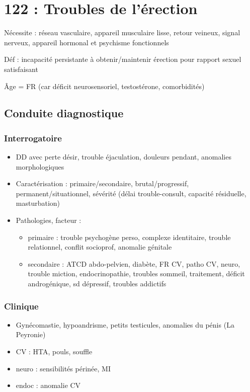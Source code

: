 \documentclass[11pt]{article}
\begin{document}
\section{122 : Troubles de l'érection}
\label{sec:org83aaa7d}
Nécessite : réseau vasculaire, appareil musculaire lisse, retour veineux, signal  nerveux,
appareil hormonal et psychisme fonctionnels

Déf : incapacité persistante à obtenir/maintenir érection pour rapport sexuel satisfaisant

Âge = FR (car déficit neurosensoriel, \inc testostérone, comorbidités)

\subsection{Conduite  diagnostique}
\label{sec:org6e5a81d}
\subsubsection{Interrogatoire}
\label{sec:org4ae28f0}
\begin{itemize}
\item DD avec perte désir, trouble éjaculation, douleurs pendant, anomalies morphologiques
\item Caractérisation : primaire/secondaire, brutal/progressif,
permanent/situationnel, sévérité (délai trouble-consult, capacité résiduelle,
masturbation)
\item Pathologies, facteur :
\begin{itemize}
\item primaire : trouble psychogène perso, complexe identitaire, trouble
relationnel, conflit socioprof, anomalie génitale
\item secondaire : ATCD abdo-pelvien, diabète, FR CV, patho CV, neuro, trouble
miction, endocrinopathie, troubles sommeil, traitement, déficit
androgénique, sd dépressif, troubles addictifs
\end{itemize}
\end{itemize}
\subsubsection{Clinique}
\label{sec:orgdc17b06}
\begin{itemize}
\item Gynécomastie, hypoandrisme, petits testicules, anomalies du pénis (La Peyronie)
\item CV : HTA, pouls, souffle
\item neuro : sensibilités périnée, MI
\item endoc : anomalie CV
\end{itemize}
\end{document}
